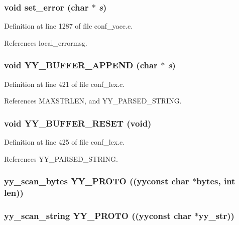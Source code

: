 \subsubsection{\setlength{\rightskip}{0pt plus 5cm}void set\_\-error (char $\ast$ {\em s})}\label{conf__lex_8c_a108}




Definition at line 1287 of file conf\_\-yacc.c.

References local\_\-errormsg.
\subsubsection{\setlength{\rightskip}{0pt plus 5cm}void YY\_\-BUFFER\_\-APPEND (char $\ast$ {\em s})}\label{conf__lex_8c_a109}




Definition at line 421 of file conf\_\-lex.c.

References MAXSTRLEN, and YY\_\-PARSED\_\-STRING.
\subsubsection{\setlength{\rightskip}{0pt plus 5cm}void YY\_\-BUFFER\_\-RESET (void)}\label{conf__lex_8c_a110}




Definition at line 425 of file conf\_\-lex.c.

References YY\_\-PARSED\_\-STRING.
\subsubsection{ yy\_\-scan\_\-bytes YY\_\-PROTO ((yyconst char $\ast$bytes, int {\bf len}))}\label{conf__lex_8c_a102}


\subsubsection{ yy\_\-scan\_\-string YY\_\-PROTO ((yyconst char $\ast$yy\_\-str))}\label{conf__lex_8c_a101}


